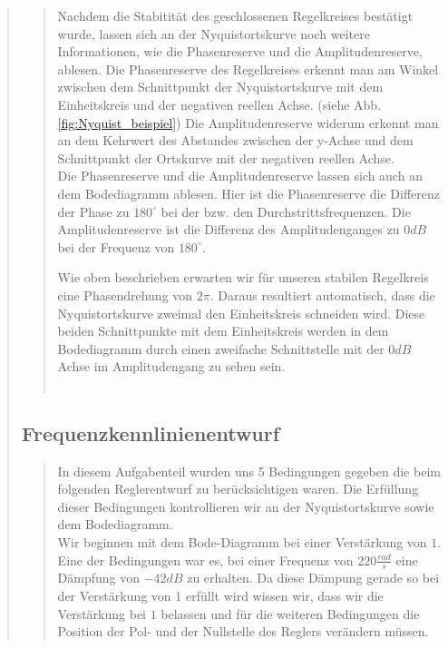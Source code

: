 \begin{quote}
\begin{quote}
        
        Nachdem die Stabitität des geschlossenen Regelkreises bestätigt wurde, lassen sich an der Nyquistortskurve noch weitere
        Informationen, wie die Phasenreserve und die Amplitudenreserve, ablesen. Die Phasenreserve des Regelkreises erkennt
        man am Winkel zwischen dem Schnittpunkt der Nyquistortskurve mit dem Einheitskreis und der negativen reellen
        Achse. (siehe Abb. \ref{fig:Nyquist_beispiel}) Die Amplitudenreserve widerum erkennt man an dem Kehrwert des Abstandes
        zwischen der y-Achse und dem Schnittpunkt der Ortskurve mit der negativen reellen Achse.\\
        Die Phasenreserve und die Amplitudenreserve lassen sich auch an dem Bodediagramm ablesen. Hier ist die
        Phasenreserve die Differenz der Phase zu $180^{\circ}$ bei der bzw. den Durchstrittsfrequenzen. Die Amplitudenreserve
        ist die Differenz des Amplitudenganges zu $0dB$ bei der Frequenz von $180^{\circ}$.\vspace{1em}
        
        Wie oben beschrieben erwarten wir für unseren stabilen Regelkreis eine Phasendrehung von $2\pi$. Daraus resultiert
        automatisch, dass die Nyquistortskurve zweimal den Einheitskreis schneiden wird. Diese beiden Schnittpunkte mit dem
        Einheitskreis werden in dem Bodediagramm durch einen zweifache Schnittstelle mit der $0dB$ Achse im Amplitudengang zu
        sehen sein.\\
         \\
        
        
    \end{quote} %
    
    \subsection{Frequenzkennlinienentwurf}
    \begin{quote}
        In diesem Aufgabenteil wurden uns 5 Bedingungen gegeben die beim folgenden Reglerentwurf zu berücksichtigen
        waren. Die Erfüllung dieser Bedingungen kontrollieren wir an der Nyquistortskurve sowie dem Bodediagramm.\\
        Wir beginnen mit dem Bode-Diagramm bei einer Verstärkung von $1$. Eine der Bedingungen war es, bei einer Frequenz
        von $220 \frac{rad}{s}$ eine Dämpfung von $-42 dB$ zu erhalten. Da diese Dämpung gerade so bei der Verstärkung
        von $1$ erfüllt wird wissen wir, dass wir die Verstärkung bei $1$ belassen und für die weiteren Bedingungen die
        Position der Pol- und der Nullstelle des Reglers verändern müssen.\vspace{1em}
        

\end{quote}
\end{quote}
